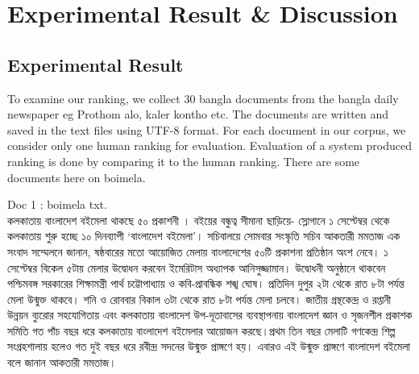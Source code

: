 \chapter{Experimental Result \& Discussion}
\label{Ch_Chapter5}


\section{Experimental Result}

To examine our ranking, we collect 30 bangla documents from the bangla daily newspaper eg Prothom alo, kaler kontho etc. The documents are written and saved in the text files using UTF-8 format. For each document in our corpus, we consider only one human ranking for evaluation. Evaluation of a system produced ranking is done by comparing it to the human ranking. There are some documents here on boimela.

Doc 1 : boimela txt.\\
কলকাতায় বাংলাদেশ বইমেলা থাকছে ৫০ প্রকাশনী । বইয়ের বন্ধুত্ব সীমানা ছাড়িয়ে- স্লোগানে ১ সেপ্টেম্বর থেকে কলকাতায় শুরু হচ্ছে ১০ দিনব্যাপী ‘বাংলাদেশ বইমেলা’। সচিবালয়ে সোমবার সংস্কৃতি সচিব আকতারী মমতাজ এক সংবাদ সম্মেলনে জানান, ষষ্ঠবারের মতো আয়োজিত মেলায় বাংলাদেশের ৫০টি প্রকাশনা প্রতিষ্ঠান অংশ নেবে। ১ সেপ্টেম্বর বিকেল ৫টায় মেলার উদ্বোধন করবেন ইমেরিটাস অধ্যাপক আনিসুজ্জামান। উদ্বোধনী অনুষ্ঠানে থাকবেন পশ্চিমবঙ্গ সরকারের শিক্ষামন্ত্রী পার্থ চট্টোপাধ্যায় ও কবি-প্রাবন্ধিক শঙ্খ ঘোষ। প্রতিদিন দুপুর ২টা থেকে রাত ৮টা পর্যন্ত মেলা উন্মুক্ত থাকবে। শনি ও রোববার বিকাল ৩টা থেকে রাত ৮টা পর্যন্ত মেলা চলবে।
জাতীয় গ্রন্থকেন্দ্র ও রপ্তানী উন্নয়ন ব্যুরোর সহযোগিতায় এবং কলকাতায় বাংলাদেশ উপ-দূতাবাসের ব্যবস্থাপনায় বাংলাদেশ জ্ঞান ও সৃজনশীল প্রকাশক সমিতি গত পাঁচ বছর ধরে কলকাতায় বাংলাদেশ বইমেলার আয়োজন করছে।প্রথম তিন বছর মেলাটি গণকেন্দ্র শিল্প সংগ্রহশালায় হলেও গত দুই বছর ধরে রবীন্দ্র সদনের উন্মুক্ত প্রাঙ্গণে হয়। এবারও এই উন্মুক্ত প্রাঙ্গণে বাংলাদেশ বইমেলা বলে জানান আকতারী মমতাজ।

